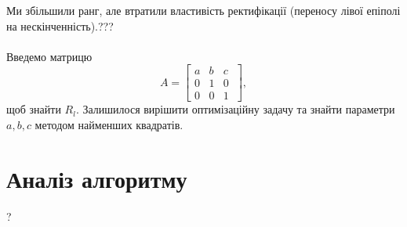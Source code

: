 Ми збільшили ранг, але втратили властивість ректифікації (переносу 
лівої епіполі
на нескінченність).???
\\\\
\indent
Введемо матрицю 
\begin{equation}
    A =
    \left[
    \begin{matrix}
    a & b & c\\
    0 & 1 & 0\\
    0 & 0 & 1\
    \end{matrix}
    \right],
\end{equation}
щоб знайти $R_l$. Залишилося вирішити оптимізаційну задачу та знайти параметри 
$a, b, c$ методом найменших квадратів.  











\section{Аналіз алгоритму}
?